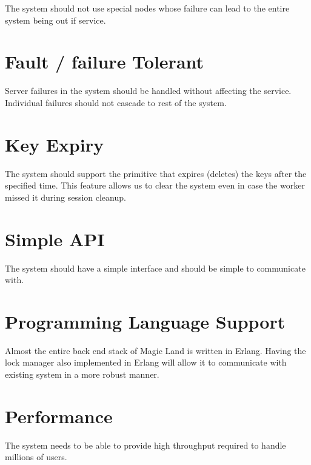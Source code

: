 
The system should not use special nodes whose failure can lead to the
entire system being out if service.

\section{Fault / failure Tolerant}


Server failures in the system should be handled without affecting the service.
Individual failures should not cascade to rest of the system.

\section{Key Expiry}


The system should support the primitive that expires (deletes) the keys after
the specified time. This feature allows us to clear the system even in case
the worker missed it during session cleanup.

\section{Simple API}


The system should have a simple interface and should be simple to communicate
with.

\section{Programming Language Support}


Almost the entire back end stack of Magic Land is written in Erlang. Having the
lock manager also implemented in Erlang will allow it to communicate with
existing system in a more robust manner.

\section{Performance}


The system needs to be able to provide high throughput required to handle
millions of users.

